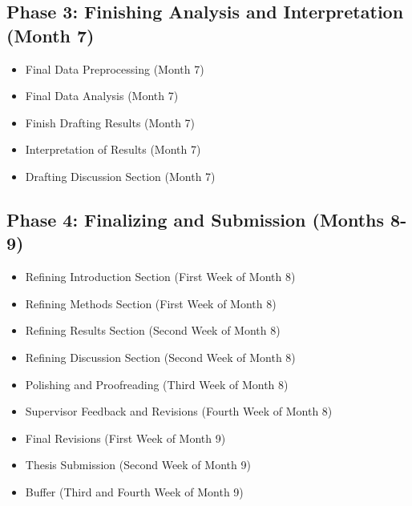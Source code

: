 \documentclass[12pt]{article} %
\begin{document}
\subsection{Phase 3: Finishing Analysis and Interpretation (Month 7)}
\begin{itemize}
    \item Final Data Preprocessing (Month 7)
    \item Final Data Analysis (Month 7)
    \item Finish Drafting Results (Month 7)
    \item Interpretation of Results (Month 7)
    \item Drafting Discussion Section (Month 7)
\end{itemize}

\subsection{Phase 4: Finalizing and Submission (Months 8-9)}
\begin{itemize}
    \item Refining Introduction Section (First Week of Month 8)
    \item Refining Methods Section (First Week of Month 8)
    \item Refining Results Section (Second Week of Month 8)
    \item Refining Discussion Section (Second Week of Month 8)
    \item Polishing and Proofreading (Third Week of Month 8)
    \item Supervisor Feedback and Revisions (Fourth Week of Month 8)
    \item Final Revisions (First Week of Month 9)
    \item Thesis Submission (Second Week of Month 9)
    \item Buffer (Third and Fourth Week of Month 9)
\end{itemize}

\newpage %
\printbibliography %
\end{document}
